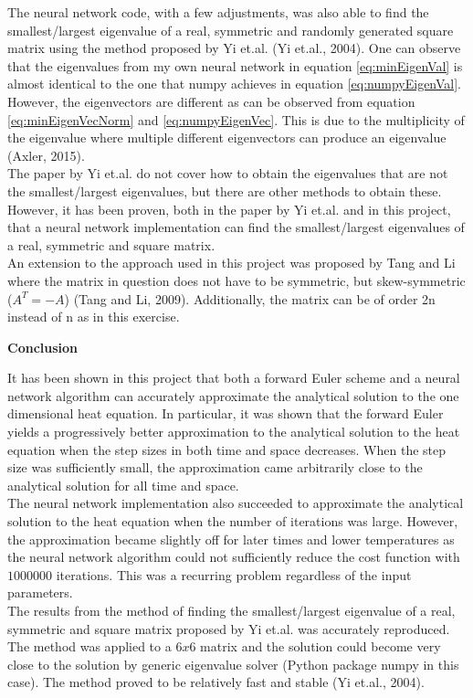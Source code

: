 \documentclass[12pt,a4paper]{article}
\begin{document}
\noindent The neural network code, with a few adjustments, was also able to find the smallest/largest eigenvalue of a real, symmetric and randomly generated square matrix using the method proposed by Yi et.al. (Yi et.al., 2004). One can observe that the eigenvalues from my own neural network in equation \ref{eq:minEigenVal} is almost identical to the one that numpy achieves in equation \ref{eq:numpyEigenVal}. However, the eigenvectors are different as can be observed from equation \ref{eq:minEigenVecNorm} and \ref{eq:numpyEigenVec}. This is due to the multiplicity of the eigenvalue where multiple different eigenvectors can produce an eigenvalue (Axler, 2015).
\\
The paper by Yi et.al. do not cover how to obtain the eigenvalues that are not the smallest/largest eigenvalues, but there are other methods to obtain these. However, it has been proven, both in the paper by Yi et.al. and in this project, that a neural network implementation can find the smallest/largest eigenvalues of a real, symmetric and square matrix.
\\
An extension to the approach used in this project was proposed by Tang and Li where the matrix in question does not have to be symmetric, but skew-symmetric ($A^T = -A$) (Tang and Li, 2009). Additionally, the matrix can be of order 2n instead of n as in this exercise. 

\newpage

\begin{center}
\Large{\textbf{Conclusion}}
\end{center}

\noindent It has been shown in this project that both a forward Euler scheme and a neural network algorithm can accurately approximate the analytical solution to the one dimensional heat equation. In particular, it was shown that the forward Euler yields a progressively better approximation to the analytical solution to the heat equation when the step sizes in both time and space decreases. When the step size was sufficiently small, the approximation came arbitrarily close to the analytical solution for all time and space.
\\
The neural network implementation also succeeded to approximate the analytical solution to the heat equation when the number of iterations was large. However, the approximation became slightly off for later times and lower temperatures as the neural network algorithm could not sufficiently reduce the cost function with $1000000$ iterations. This was a recurring problem regardless of the input parameters.
\\
The results from the method of finding the smallest/largest eigenvalue of a real, symmetric and square matrix proposed by Yi et.al. was accurately reproduced. The method was applied to a $6x6$ matrix and the solution could become very close to the solution by generic eigenvalue solver (Python package numpy in this case). The method proved to be relatively fast and stable (Yi et.al., 2004).
\end{document}

